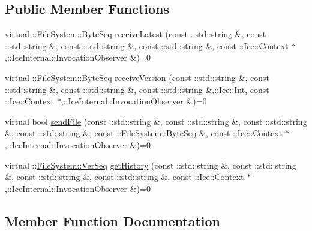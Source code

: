 \subsection*{Public Member Functions}
\begin{DoxyCompactItemize}
\item 
virtual \+::\hyperlink{namespace_file_system_a5c85de065f9c451ae1d1dea2dacb68c5}{File\+System\+::\+Byte\+Seq} \hyperlink{class_ice_delegate_1_1_file_system_1_1_file_aa6c349d0af2414f01f67471cc77761cf}{receive\+Latest} (const \+::std\+::string \&, const \+::std\+::string \&, const \+::std\+::string \&, const \+::std\+::string \&, const \+::Ice\+::\+Context $\ast$,\+::Ice\+Internal\+::\+Invocation\+Observer \&)=0
\item 
virtual \+::\hyperlink{namespace_file_system_a5c85de065f9c451ae1d1dea2dacb68c5}{File\+System\+::\+Byte\+Seq} \hyperlink{class_ice_delegate_1_1_file_system_1_1_file_a97482e33e323674fce8cca71eb8a8a50}{receive\+Version} (const \+::std\+::string \&, const \+::std\+::string \&, const \+::std\+::string \&, const \+::std\+::string \&,\+::Ice\+::\+Int, const \+::Ice\+::\+Context $\ast$,\+::Ice\+Internal\+::\+Invocation\+Observer \&)=0
\item 
virtual bool \hyperlink{class_ice_delegate_1_1_file_system_1_1_file_acb09c75ad462eb1a243a1b80dbce0863}{send\+File} (const \+::std\+::string \&, const \+::std\+::string \&, const \+::std\+::string \&, const \+::std\+::string \&, const \+::\hyperlink{namespace_file_system_a5c85de065f9c451ae1d1dea2dacb68c5}{File\+System\+::\+Byte\+Seq} \&, const \+::Ice\+::\+Context $\ast$,\+::Ice\+Internal\+::\+Invocation\+Observer \&)=0
\item 
virtual \+::\hyperlink{namespace_file_system_ac32dc1eb34c060160b52edc7c4e37d6e}{File\+System\+::\+Ver\+Seq} \hyperlink{class_ice_delegate_1_1_file_system_1_1_file_a5748eda06b14d3aca032850b08fa56e0}{get\+History} (const \+::std\+::string \&, const \+::std\+::string \&, const \+::std\+::string \&, const \+::std\+::string \&, const \+::Ice\+::\+Context $\ast$,\+::Ice\+Internal\+::\+Invocation\+Observer \&)=0
\end{DoxyCompactItemize}


\subsection{Member Function Documentation}
\hypertarget{class_ice_delegate_1_1_file_system_1_1_file_a5748eda06b14d3aca032850b08fa56e0}{}
